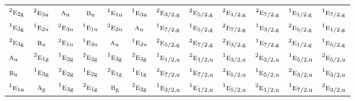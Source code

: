 \documentclass[10pt,a4paper]{article}
\numberwithin{equation}{section}
\newcommand{\irr}[1]{\text{\normalfont\scshape #1}}
\newcommand{\conjpair}[1]{{}^{#1}}
\newcommand{\ptag}[1]{\mathrm{#1}}
\begin{document}
{\begin{longtable}{@{}lccccccccccc@{}}
$\conjpair{2}\irr{e}_{2\ptag{g}}$ & $\conjpair{2}\irr{e}_{3\ptag{u}}$ & $\irr{a}_{\ptag{u}}$ & $\irr{b}_{\ptag{u}}$ & $\conjpair{1}\irr{e}_{1\ptag{u}}$ & $\conjpair{1}\irr{e}_{3\ptag{u}}$ & $\conjpair{2}\irr{e}_{3/2,\ptag{g}}$ & $\conjpair{2}\irr{e}_{5/2,\ptag{g}}$ & $\conjpair{2}\irr{e}_{1/2,\ptag{g}}$ & $\conjpair{2}\irr{e}_{7/2,\ptag{g}}$ & $\conjpair{1}\irr{e}_{1/2,\ptag{g}}$ & $\conjpair{1}\irr{e}_{7/2,\ptag{g}}$\\
$\conjpair{1}\irr{e}_{3\ptag{g}}$ & $\conjpair{1}\irr{e}_{2\ptag{u}}$ & $\conjpair{2}\irr{e}_{3\ptag{u}}$ & $\conjpair{1}\irr{e}_{1\ptag{u}}$ & $\conjpair{2}\irr{e}_{2\ptag{u}}$ & $\irr{a}_{\ptag{u}}$ & $\conjpair{1}\irr{e}_{7/2,\ptag{g}}$ & $\conjpair{1}\irr{e}_{5/2,\ptag{g}}$ & $\conjpair{2}\irr{e}_{7/2,\ptag{g}}$ & $\conjpair{1}\irr{e}_{3/2,\ptag{g}}$ & $\conjpair{2}\irr{e}_{5/2,\ptag{g}}$ & $\conjpair{1}\irr{e}_{1/2,\ptag{g}}$\\
$\conjpair{2}\irr{e}_{3\ptag{g}}$ & $\irr{b}_{\ptag{u}}$ & $\conjpair{2}\irr{e}_{1\ptag{u}}$ & $\conjpair{1}\irr{e}_{3\ptag{u}}$ & $\irr{a}_{\ptag{u}}$ & $\conjpair{1}\irr{e}_{2\ptag{u}}$ & $\conjpair{2}\irr{e}_{5/2,\ptag{g}}$ & $\conjpair{2}\irr{e}_{7/2,\ptag{g}}$ & $\conjpair{2}\irr{e}_{3/2,\ptag{g}}$ & $\conjpair{1}\irr{e}_{7/2,\ptag{g}}$ & $\conjpair{2}\irr{e}_{1/2,\ptag{g}}$ & $\conjpair{1}\irr{e}_{5/2,\ptag{g}}$\\
$\irr{a}_{\ptag{u}}$ & $\conjpair{2}\irr{e}_{1\ptag{g}}$ & $\conjpair{1}\irr{e}_{2\ptag{g}}$ & $\conjpair{2}\irr{e}_{2\ptag{g}}$ & $\conjpair{1}\irr{e}_{3\ptag{g}}$ & $\conjpair{2}\irr{e}_{3\ptag{g}}$ & $\conjpair{1}\irr{e}_{1/2,\ptag{u}}$ & $\conjpair{2}\irr{e}_{1/2,\ptag{u}}$ & $\conjpair{1}\irr{e}_{3/2,\ptag{u}}$ & $\conjpair{2}\irr{e}_{3/2,\ptag{u}}$ & $\conjpair{1}\irr{e}_{5/2,\ptag{u}}$ & $\conjpair{2}\irr{e}_{5/2,\ptag{u}}$\\
$\irr{b}_{\ptag{u}}$ & $\conjpair{1}\irr{e}_{3\ptag{g}}$ & $\conjpair{2}\irr{e}_{2\ptag{g}}$ & $\conjpair{1}\irr{e}_{2\ptag{g}}$ & $\conjpair{2}\irr{e}_{1\ptag{g}}$ & $\conjpair{1}\irr{e}_{1\ptag{g}}$ & $\conjpair{2}\irr{e}_{7/2,\ptag{u}}$ & $\conjpair{1}\irr{e}_{7/2,\ptag{u}}$ & $\conjpair{2}\irr{e}_{5/2,\ptag{u}}$ & $\conjpair{1}\irr{e}_{5/2,\ptag{u}}$ & $\conjpair{2}\irr{e}_{3/2,\ptag{u}}$ & $\conjpair{1}\irr{e}_{3/2,\ptag{u}}$\\
$\conjpair{1}\irr{e}_{1\ptag{u}}$ & $\irr{a}_{\ptag{g}}$ & $\conjpair{1}\irr{e}_{3\ptag{g}}$ & $\conjpair{2}\irr{e}_{1\ptag{g}}$ & $\irr{b}_{\ptag{g}}$ & $\conjpair{2}\irr{e}_{2\ptag{g}}$ & $\conjpair{1}\irr{e}_{3/2,\ptag{u}}$ & $\conjpair{1}\irr{e}_{1/2,\ptag{u}}$ & $\conjpair{1}\irr{e}_{5/2,\ptag{u}}$ & $\conjpair{2}\irr{e}_{1/2,\ptag{u}}$ & $\conjpair{1}\irr{e}_{7/2,\ptag{u}}$ & $\conjpair{2}\irr{e}_{3/2,\ptag{u}}$\\

\end{longtable}}
\end{document}
